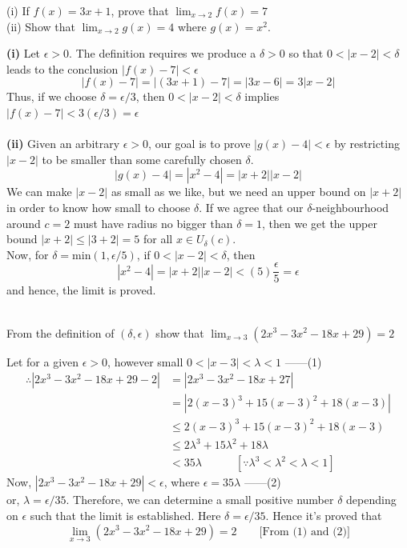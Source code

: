 \documentclass[12pt]{article}
\begin{document}
\begin{example}{(i) If $f(x) = 3x+1$, prove that $ \lim_{x \to 2} f(x) = 7 $ \\
    (ii) Show that $\lim_{x \to 2} g(x) = 4$ where $g(x)=x^2$.}

    \textbf{(i)} Let $\epsilon>0$. The definition requires we produce a $\delta>0$ so that $0<|x-2|<\delta$ leads to the conclusion $|f(x)-7|<\epsilon$ \[
        |f(x)-7| = |(3x+1)-7| = |3x-6| = 3|x-2|
    \]
    Thus, if we choose $\delta=\epsilon/3$, then $0<|x-2|<\delta$ implies $|f(x)-7|<3(\epsilon/3)=\epsilon$ \\~\\
    
    \textbf{(ii)} Given an arbitrary $\epsilon>0$, our goal is to prove $|g(x)-4|<\epsilon$ by restricting $| x-2 |$ to be smaller than some carefully chosen $\delta$. \[
        |g(x)-4| = |x^2-4| = |x+2||x-2|
    \] We can make $|x-2|$ as small as we like, but we need an upper bound on $|x+2|$ in order to know how small to choose $\delta$. If we agree that our $\delta$-neighbourhood around $c=2$ must have radius no bigger than $\delta=1$, then we get the upper bound $|x+2|\le |3+2|=5$ for all $x\in U_\delta(c)$. \\
    Now, for $\delta=\text{min}(1,\epsilon/5)$, if $0<|x-2|<\delta$, then \[
        |x^2-4| = |x+2||x-2| < (5)\frac{\epsilon}{5} = \epsilon
    \] and hence, the limit is proved. \\~\\
\end{example}

\begin{example}{From the definition of $(\delta,\epsilon)$ show that $\lim_{x \to 3} (2x^3-3x^2-18x+29)=2$}

    Let for a given $\epsilon>0$, however small $0<|x-3|<\lambda<1$ ------(1)
    \begin{align*}
        \therefore |2x^3-3x^2-18x+29 - 2| &= |2x^3-3x^2-18x+27| \\
        &= |2(x-3)^3 + 15(x-3)^2 + 18(x-3)| \\
        &\le 2(x-3)^3 + 15(x-3)^2 + 18(x-3) \\
        &\le 2\lambda^3 + 15\lambda^2 + 18\lambda \\
        &< 35\lambda \quad\quad\quad [ \because \lambda^3<\lambda^2<\lambda<1 ]
    \end{align*}
    Now, $|2x^3-3x^2-18x+29|<\epsilon$, where $\epsilon=35\lambda$ ------(2) \\
    or, $\lambda=\epsilon/35$. Therefore, we can determine a small positive number $\delta$ depending on $\epsilon$ such that the limit is established. Here $\delta=\epsilon/35$. Hence it's proved that \[
        \lim_{x \to 3} (2x^3-3x^2-18x+29) = 2 \quad\quad \text{[From (1) and (2)]}
    \]
\end{example}
\end{document}
